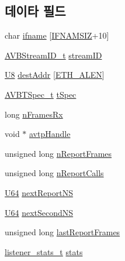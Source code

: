 \subsection*{데이타 필드}
\begin{DoxyCompactItemize}
\item 
char \hyperlink{structlistener__data__t_a11d6071e5fa37b0c5776e17651485f11}{ifname} \mbox{[}\hyperlink{tl_2openavb__tl__pub_8h_acd06da230a96d3b7e6f193c5b3142002}{I\+F\+N\+A\+M\+S\+IZ}+10\mbox{]}
\item 
\hyperlink{struct_a_v_b_stream_i_d__t}{A\+V\+B\+Stream\+I\+D\+\_\+t} \hyperlink{structlistener__data__t_a989c1ccd88811e9926203a07d587bc21}{stream\+ID}
\item 
\hyperlink{openavb__types__base__pub_8h_aa63ef7b996d5487ce35a5a66601f3e73}{U8} \hyperlink{structlistener__data__t_a016f2167ae2143dcacd762c10be2f614}{dest\+Addr} \mbox{[}\hyperlink{avb__avtp_8h_a9822d89774e0d6ddaa06503950130423}{E\+T\+H\+\_\+\+A\+L\+EN}\mbox{]}
\item 
\hyperlink{struct_a_v_b_t_spec__t}{A\+V\+B\+T\+Spec\+\_\+t} \hyperlink{structlistener__data__t_ab928eca0e7b010a8cc3a80be5bc8adcc}{t\+Spec}
\item 
long \hyperlink{structlistener__data__t_a4d0ba87ab9f36db73f5e9411f36d530c}{n\+Frames\+Rx}
\item 
void $\ast$ \hyperlink{structlistener__data__t_a4b9351eb0c3d027b65d2babae355d2c1}{avtp\+Handle}
\item 
unsigned long \hyperlink{structlistener__data__t_a212b085a1e0d5676fceeb1aa16c045a4}{n\+Report\+Frames}
\item 
unsigned long \hyperlink{structlistener__data__t_a84898187f451ec315f2da98794da5cd7}{n\+Report\+Calls}
\item 
\hyperlink{openavb__types__base__pub_8h_a25809e0734a149248fcf5831efa4e33d}{U64} \hyperlink{structlistener__data__t_a9ed17cd4b781b5f67b657069d5b4382f}{next\+Report\+NS}
\item 
\hyperlink{openavb__types__base__pub_8h_a25809e0734a149248fcf5831efa4e33d}{U64} \hyperlink{structlistener__data__t_af7e8f07dc431af3a82b4ee9b960772ce}{next\+Second\+NS}
\item 
unsigned long \hyperlink{structlistener__data__t_afcd18ba6ccac35cfc976d61591b8a718}{last\+Report\+Frames}
\item 
\hyperlink{structlistener__stats__t}{listener\+\_\+stats\+\_\+t} \hyperlink{structlistener__data__t_a7de4f08e6db1ce952196ec3a7ed358f1}{stats}
\end{DoxyCompactItemize}



